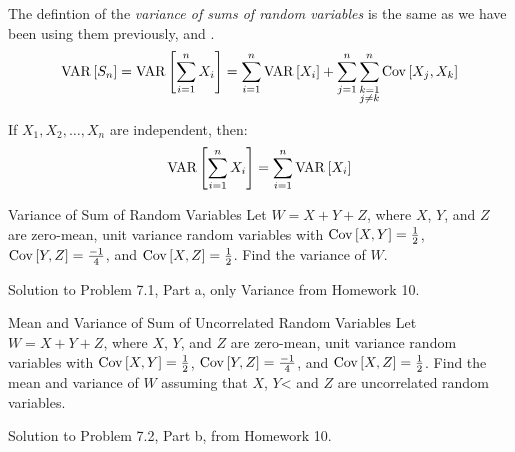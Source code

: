 \begin{definition}\label{def:Variance of Sums of Random Variables}
  The defintion of the \emph{variance of sums of random variables} is the same as we have been using them previously,  and .
  \begin{equation}\label{eq:Variance of Sums of Random Variables}
    \operatorname{\operatorname{VAR}} \left[ S_{n} \right] = \operatorname{\operatorname{VAR}} \left[ \sum_{i=1}^{n} X_{i} \right] = \sum_{i=1}^{n} \operatorname{\operatorname{VAR}} \left[ X_{i} \right] + \sum_{j=1}^{n} \sum_{\substack{k=1 \\ j \neq k}}^{n} \operatorname{\operatorname{Cov}} \left[ X_{j}, X_{k} \right]
  \end{equation}
  \begin{remark}\label{rmk:Variance of Sums of Independent Random Variables}
    If $X_{1}, X_{2}, \ldots , X_{n}$ are independent, then:
    \begin{equation}\label{eq:Variance of Sums of Independent Random Variables}
      \operatorname{\operatorname{VAR}} \left[ \sum_{i=1}^{n} X_{i} \right] = \sum_{i=1}^{n} \operatorname{\operatorname{VAR}} \left[ X_{i} \right]
    \end{equation}
  \end{remark}
\end{definition}
\begin{example}[Problem 7.1]{Variance of Sum of Random Variables}
  Let $W = X + Y + Z$, where $X$, $Y$, and $Z$ are zero-mean, unit variance random variables with $\operatorname{\operatorname{Cov}} \left[ X,Y \right] = \frac{1}{2}$, $\operatorname{\operatorname{Cov}} \left[ Y,Z \right] = \frac{-1}{4}$, and $\operatorname{\operatorname{Cov}} \left[ X,Z \right] = \frac{1}{2}$.
  Find the variance of $W$.

  \tcblower

  Solution to Problem 7.1, Part a, only Variance from Homework 10.
\end{example}
\begin{example}[Problem 7.1]{Mean and Variance of Sum of Uncorrelated Random Variables}
  Let $W = X + Y + Z$, where $X$, $Y$, and $Z$ are zero-mean, unit variance random variables with $\operatorname{\operatorname{Cov}} \left[ X,Y \right] = \frac{1}{2}$, $\operatorname{\operatorname{Cov}} \left[ Y,Z \right] = \frac{-1}{4}$, and $\operatorname{\operatorname{Cov}} \left[ X,Z \right] = \frac{1}{2}$.
  Find the mean and variance of $W$ assuming that $X$, $Y$< and $Z$ are uncorrelated random variables.

  \tcblower

  Solution to Problem 7.2, Part b, from Homework 10.
\end{example}
